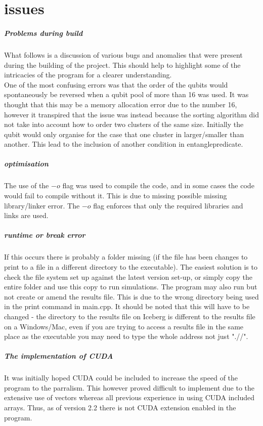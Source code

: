 \documentclass{article}
\numberwithin{equation}{section} %
\begin{document}
\section{issues}

\subparagraph{Problems during build}
What follows is a discussion of various bugs and anomalies that were present during the building of the project. This should help to highlight some of the intricacies of the program for a clearer understanding. \\

One of the most confusing errors was that the order of the qubits would spontaneously be reversed when a qubit pool of more than 16 was used. It was thought that this may be a memory allocation error due to the number 16, however it transpired that the issue was instead because the sorting algorithm did not take into account how to order two clusters of the same size. Initially the qubit would only organise for the case that one cluster in larger/smaller than another. This lead to the inclusion of another condition in entangle\textunderscore predicate. 


\subparagraph{optimisation}
The use of the $-o$ flag was used to compile the code, and in some cases the code would fail to compile without it. This is due to missing possible missing library/linker error. The $-o$ flag enforces that only the required libraries and links are used. 

\subparagraph{runtime or break error} 
If this occurs there is probably a folder missing (if the file has been changes to print to a file in a different directory to the executable). The easiest solution is to check the file system set up against the latest version set-up, or simply copy the entire folder and use this copy to run simulations. The program may also run but not create or amend the results file. This is due to the wrong directory being used in the print command in main.cpp. It should be noted that this will have to be changed - the directory to the results file on Iceberg is different to the results file on a Windows/Mac, even if you are trying to access a results file in the same place as the executable you may need to type the whole address not just ".//". 

\subparagraph{The implementation of CUDA} 
It was initially hoped CUDA could be included to increase the speed of the program to the parralism. This however proved difficult to implement due to the extensive use of vectors whereas all previous experience in using CUDA included arrays. Thus, as of version 2.2 there is not CUDA extension enabled in the program. 
\end{document}

